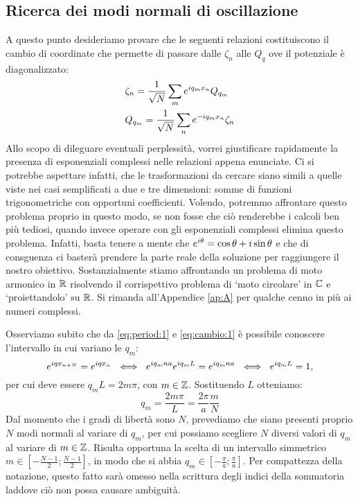     \subsection{Ricerca dei modi normali di oscillazione}
        A questo punto desideriamo provare che le seguenti relazioni costituiscono il cambio di coordinate che permette di passare dalle $\zeta_n$ alle $Q_q$ ove il potenziale \`e diagonalizzato:
        \begin{align}
            &\zeta_n=\frac{1}{\sqrt{N}}\sum_me^{iq_mx_n}Q_{q_m} \label{eq:cambio:1}\\
            &Q_{q_m}=\frac{1}{\sqrt{N}}\sum_n e^{-iq_mx_n}\zeta_n \label{eq:cambio:2}
        \end{align}
        Allo scopo di dileguare eventuali perplessit\`a, vorrei giustificare rapidamente la presenza di esponenziali complessi nelle relazioni appena enunciate. Ci si potrebbe aspettare infatti, che le trasformazioni da cercare siano simili a quelle viste nei casi semplificati a due e tre dimensioni: somme di funzioni trigonometriche con opportuni coefficienti. Volendo, potremmo affrontare questo problema proprio in questo modo, se non fosse che ci\`o renderebbe i calcoli ben pi\`u tediosi, quando invece operare con gli esponenziali complessi elimina questo problema. Infatti, basta tenere a mente che $e^{i\theta}=\cos\theta+i\sin\theta$ e che di consguenza ci baster\`a prendere la parte reale della soluzione per raggiungere il nostro obiettivo. Sostanzialmente stiamo affrontando un problema di moto armonico in $\mathbb{R}$ risolvendo il corrispettivo problema di `moto circolare' in $\mathbb{C}$ e `proiettandolo' su $\mathbb{R}$. Si rimanda all'Appendice \ref{ap:A} per qualche cenno in pi\`u ai numeri complessi.
        \par Osserviamo subito che da \eqref{eq:period:1} e \eqref{eq:cambio:1} \`e possibile conoscere l'intervallo in cui variano le $q_m$:
            $$\myexp{iqx_{n+N}}=\myexp{iqx_n}\ \iff\ \myexp{iq_mna}\myexp{iq_mL}=\myexp{iq_mna}\ \iff\ \myexp{iq_mL}=1,$$
        per cui deve essere $q_mL=2m\pi$, con $m\in\mathbb{Z}$. Sostituendo $L$ otteniamo:
        \begin{equation}
            q_m=\frac{2m\pi}{L}=\frac{2\pi}{a}\frac{m}{N}
            \label{eq:q}
        \end{equation}
        Dal momento che i gradi di libert\`a sono $N$, prevediamo che siano presenti proprio $N$ modi normali al variare di $q_m$, per cui possiamo scegliere $N$ diversi valori di $q_m$ al variare di $m\in\mathbb{Z}$. Risulta opportuna la scelta di un intervallo simmetrico $\displaystyle m\in\left[-\frac{N-1}{2};\frac{N-1}{2}\right]$, in modo che si abbia $\displaystyle q_m\in\left[-\frac{\pi}{a};\frac{\pi}{a}\right]$. Per compattezza della notazione, questo fatto sar\`a omesso nella scrittura degli indici della sommatoria laddove ci\`o non possa causare ambiguit\`a. 
